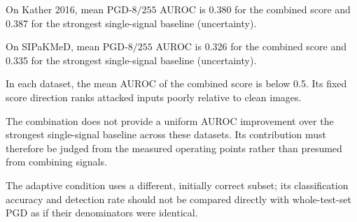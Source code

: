 On Kather 2016, mean PGD-$8/255$ AUROC is 0.380 for the combined score and 0.387 for the strongest single-signal baseline (uncertainty).

On SIPaKMeD, mean PGD-$8/255$ AUROC is 0.326 for the combined score and 0.335 for the strongest single-signal baseline (uncertainty).

In each dataset, the mean AUROC of the combined score is below 0.5. Its fixed score direction ranks attacked inputs poorly relative to clean images.

The combination does not provide a uniform AUROC improvement over the strongest single-signal baseline across these datasets. Its contribution must therefore be judged from the measured operating points rather than presumed from combining signals.

The adaptive condition uses a different, initially correct subset; its classification accuracy and detection rate should not be compared directly with whole-test-set PGD as if their denominators were identical.
